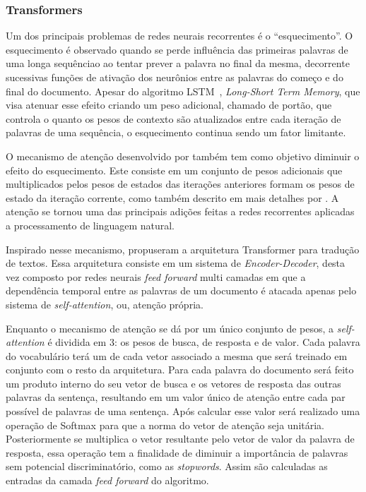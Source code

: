\subsubsection{Transformers}

Um dos principais problemas de redes neurais recorrentes é o ``esquecimento''.
O esquecimento é observado quando se perde influência das primeiras palavras de
uma longa sequênciao ao tentar prever a palavra no final da mesma, decorrente
sucessivas funções de ativação dos neurônios entre as palavras do começo e do
final do documento.
Apesar do algoritmo LSTM~\cite{hochreiter97}, \textit{Long-Short Term Memory},
que visa atenuar esse efeito criando um peso adicional, chamado de portão, que
controla o quanto os pesos de contexto são atualizados entre cada iteração de
palavras de uma sequência, o esquecimento continua sendo um fator limitante.

O mecanismo de atenção desenvolvido por \citet{bahdanau14} também tem como
objetivo diminuir o efeito do esquecimento.
Este consiste em um conjunto de pesos adicionais que multiplicados pelos pesos
de estados das iterações anteriores formam os pesos de estado da iteração
corrente, como também descrito em mais detalhes por \citet{luong15}.
A atenção se tornou uma das principais adições feitas a redes recorrentes
aplicadas a processamento de linguagem natural.


Inspirado nesse mecanismo, \citet{vaswani17} propuseram a arquitetura
Transformer para tradução de textos.
Essa arquitetura consiste em um sistema de \textit{Encoder-Decoder}, desta vez
composto por redes neurais \textit{feed forward} multi camadas em que a
dependência temporal entre as palavras de um documento é atacada apenas pelo
sistema de \textit{self-attention}, ou, atenção própria.

Enquanto o mecanismo de atenção se dá por um único conjunto de pesos, a
\textit{self-attention} é dividida em 3: os pesos de busca, de resposta e de
valor.
Cada palavra do vocabulário terá um de cada vetor associado a mesma que será
treinado em conjunto com o resto da arquitetura.
Para cada palavra do documento será feito um produto interno do seu vetor de
busca e os vetores de resposta das outras palavras da sentença, resultando em um
valor único de atenção entre cada par possível de palavras de uma sentença.
Após calcular esse valor será realizado uma operação de Softmax para que a norma
do vetor de atenção seja unitária.
Posteriormente se multiplica o vetor resultante pelo vetor de valor da palavra
de resposta, essa operação tem a finalidade de diminuir a importância de
palavras sem potencial discriminatório, como as \textit{stopwords}.
Assim são calculadas as entradas da camada \textit{feed forward} do algoritmo.

